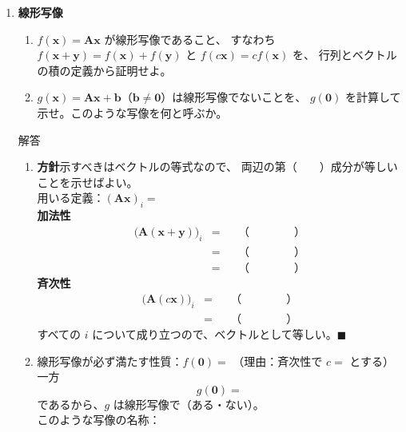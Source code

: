 \documentclass[a4paper,dvipdfmx]{jsarticle}
\newcommand{\提出期限}{2026年10月12日（月）}
\newcommand{\学籍番号}{0000000}
\newcommand{\氏名}{氏名を書く}
\newcommand{\提出日}{2026年10月12日}
\newenvironment{answer}{\begin{itembox}[l]{解答}}{\end{itembox}}
\begin{document}
\begin{enumerate}
  \item \textbf{線形写像}\quad
    \begin{enumerate}
      \item $f(\bm{x}) = \bm{A}\bm{x}$ が線形写像であること、
        すなわち $f(\bm{x}+\bm{y}) = f(\bm{x}) + f(\bm{y})$ と $f(c\bm{x}) = cf(\bm{x})$ を、
        行列とベクトルの積の定義から証明せよ。
      \item $g(\bm{x}) = \bm{A}\bm{x} + \bm{b}$（$\bm{b} \neq \bm{0}$）は線形写像でないことを、
        $g(\bm{0})$ を計算して示せ。このような写像を何と呼ぶか。
    \end{enumerate}
    \begin{answer}
      \begin{enumerate}
        \item \textbf{方針}\quad 示すべきはベクトルの等式なので、
          両辺の第（　　）成分が等しいことを示せばよい。\\
          用いる定義：$(\bm{A}\bm{x})_i = $ \\[2mm]
          \textbf{加法性}
          \begin{align*}
            \bigl(\bm{A}(\bm{x}+\bm{y})\bigr)_i &= && \text{（　　　　）} \\
                                                &= && \text{（　　　　）} \\
                                                &= && \text{（　　　　）}
          \end{align*}
          \textbf{斉次性}
          \begin{align*}
            \bigl(\bm{A}(c\bm{x})\bigr)_i &= && \text{（　　　　）} \\
                                          &= && \text{（　　　　）}
          \end{align*}
          すべての $i$ について成り立つので、ベクトルとして等しい。\hfill $\blacksquare$
        \item 線形写像が必ず満たす性質：$f(\bm{0}) = $ \phantom{XXXX}
          （理由：斉次性で $c = $ \phantom{XX} とする）\\[2mm]
          一方
          \begin{equation*}
            g(\bm{0}) =
          \end{equation*}
          であるから、$g$ は線形写像で（ある・ない）。\\
          このような写像の名称：\phantom{XXXXXXXXXXXX}
      \end{enumerate}
    \end{answer}


\end{enumerate}
\end{document}
